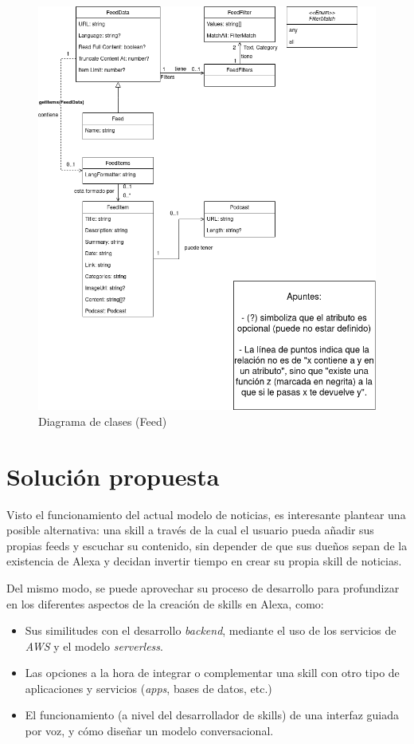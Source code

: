\documentclass[11pt,spanish,listoffigures,listoftables,table,hyphens,dvipsnames]{tfgetsinf}
\begin{document}
\begin{figure}[ht]
   \centering
   \includegraphics[width=\textwidth]{diagrama-clases-feed.png}
   \caption{Diagrama de clases (Feed)}
   \label{figura:diagrama-clases}
\end{figure}

\section{Solución propuesta}

Visto el funcionamiento del actual modelo de noticias, es interesante plantear una posible alternativa: una skill a través de la cual el usuario pueda añadir sus propias feeds y escuchar su contenido, sin depender de que sus dueños sepan de la existencia de Alexa y decidan invertir tiempo en crear su propia skill de noticias.

Del mismo modo, se puede aprovechar su proceso de desarrollo para profundizar en los diferentes aspectos de la creación de skills en Alexa, como:

\begin{itemize}
   \item Sus similitudes con el desarrollo \emph{backend}, mediante el uso de los servicios de \emph{AWS} y el modelo \emph{serverless}.
   \item Las opciones a la hora de integrar o complementar una skill con otro tipo de aplicaciones y servicios (\emph{apps}, bases de datos, etc.)
   \item El funcionamiento (a nivel del desarrollador de skills) de una interfaz guiada por voz, y cómo diseñar un modelo conversacional.
\end{itemize}
\end{document}

